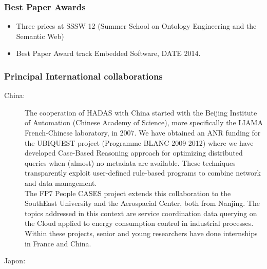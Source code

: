 \subsubsection*{Best Paper Awards}
\begin{itemize}

\item Three prices at SSSW 12 (Summer School on Ontology Engineering and the Semantic Web) 

\item Best Paper Award track Embedded Software, DATE 2014.



\end{itemize}

\subsubsection{Principal International collaborations}

\begin{description}

\item[China:] The cooperation of HADAS with China started with the Beijing Institute of Automation (Chinese Academy of Science), more specifically the LIAMA French-Chinese laboratory, in 2007. We have obtained an ANR funding for the UBIQUEST project (Programme BLANC 2009-2012) where we have developed Case-Based Reasoning approach for optimizing distributed queries when (almost) no metadata are available. These techniques transparently exploit user-defined rule-based programs to combine network and data management.\\
The FP7 People CASES project extends this collaboration to the SouthEast University and the Aerospacial Center, both from Nanjing. The topics addressed in this context are service coordination data querying on the  Cloud applied to energy consumption control in industrial processes. Within these projects, senior and young researchers have done internships in France and China.

\item[Japon:] 

\end{description}

